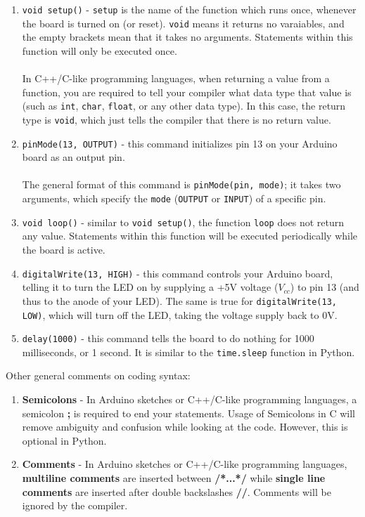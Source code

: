 \documentclass{article}
\begin{document}
\begin{tcolorbox}[breakable, title={A detailed code breakdown}]
\begin{enumerate}
    \item \texttt{void setup()} - \texttt{setup} is the name of the function which runs once, whenever the board is turned on (or reset). \texttt{void} means it returns no varaiables, and the empty brackets mean that it takes no arguments. Statements within this function will only be executed once.\\\\ In C++/C-like programming languages, when returning a value from a function, you are required to tell your compiler what data type that value is (such as \texttt{int}, \texttt{char}, \texttt{float}, or any other data type). In this case, the return type is \texttt{void}, which just tells the compiler that there is no return value.
    
    \item \texttt{pinMode(13, OUTPUT)} - this command initializes pin 13 on your Arduino board as an output pin. \\\\The general format of this command is \texttt{pinMode(pin, mode)}; it takes two arguments, which specify the \texttt{mode} (\texttt{OUTPUT} or \texttt{INPUT}) of a specific pin.
    
    \item \texttt{void loop()} - similar to \texttt{void setup()}, the function \texttt{loop} does not return any value. Statements within this function will be executed periodically while the board is active.
    
    \item \texttt{digitalWrite(13, HIGH)} - this command controls your Arduino board, telling it to turn the LED on by supplying a +5V voltage ($V_{cc}$) to pin 13 (and thus to the anode of your LED). The same is true for \texttt{digitalWrite(13, LOW)}, which will turn off the LED, taking the voltage supply back to 0V.
    
    \item \texttt{delay(1000)} - this command tells the board to do nothing for 1000 milliseconds, or 1 second. It is similar to the \texttt{time.sleep} function in Python.
\end{enumerate}
Other general comments on coding syntax:
\begin{enumerate}[resume]
    \item \textbf{Semicolons} - In Arduino sketches or C++/C-like programming languages, a semicolon \textbf{\large ;} is required to end your statements. Usage of Semicolons in C will remove ambiguity and confusion while looking at the code. However, this is optional in Python.
    
    \item \textbf{Comments} - In Arduino sketches or C++/C-like programming languages, \textbf{multiline comments} are inserted between \textbf{\large /*...*/} while \textbf{single line comments} are inserted after double backslashes \textbf{\large //}. Comments will be ignored by the compiler. 
\end{enumerate}
\end{tcolorbox}
\end{document}
